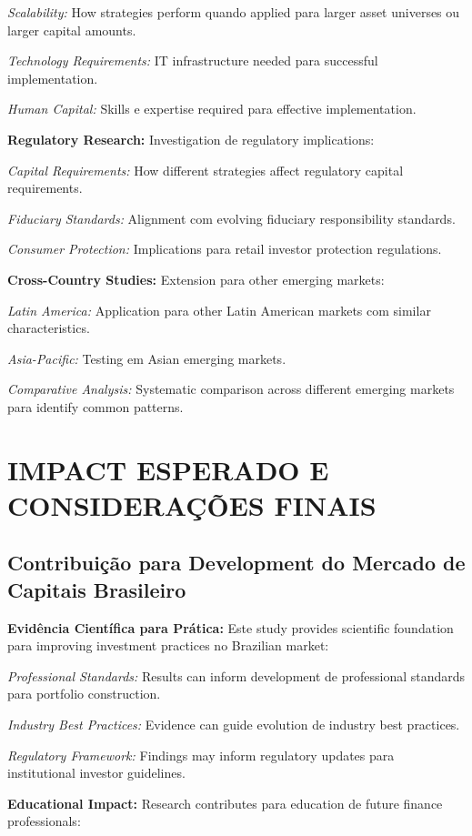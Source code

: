 \textit{Scalability:} How strategies perform quando applied para larger asset universes ou larger capital amounts.

\textit{Technology Requirements:} IT infrastructure needed para successful implementation.

\textit{Human Capital:} Skills e expertise required para effective implementation.

\textbf{Regulatory Research:} Investigation de regulatory implications:

\textit{Capital Requirements:} How different strategies affect regulatory capital requirements.

\textit{Fiduciary Standards:} Alignment com evolving fiduciary responsibility standards.

\textit{Consumer Protection:} Implications para retail investor protection regulations.

\textbf{Cross-Country Studies:} Extension para other emerging markets:

\textit{Latin America:} Application para other Latin American markets com similar characteristics.

\textit{Asia-Pacific:} Testing em Asian emerging markets.

\textit{Comparative Analysis:} Systematic comparison across different emerging markets para identify common patterns.

\section{IMPACT ESPERADO E CONSIDERAÇÕES FINAIS}

\subsection{Contribuição para Development do Mercado de Capitais Brasileiro}

\textbf{Evidência Científica para Prática:} Este study provides scientific foundation para improving investment practices no Brazilian market:

\textit{Professional Standards:} Results can inform development de professional standards para portfolio construction.

\textit{Industry Best Practices:} Evidence can guide evolution de industry best practices.

\textit{Regulatory Framework:} Findings may inform regulatory updates para institutional investor guidelines.

\textbf{Educational Impact:} Research contributes para education de future finance professionals:


